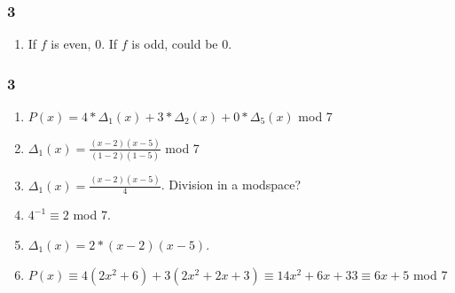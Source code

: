 \documentclass{beamer}
\begin{document}
\begin{frame}

    \frametitle{3}
    \begin{enumerate}[<+->]
        \item If $f$ is even, 0. If $f$ is odd, could be 0.
    \end{enumerate}
\end{frame}


\begin{frame}

    \frametitle{3}
    \begin{enumerate}[<+->]
        \item $P(x) = 4 * \Delta_1(x) + 3 * \Delta_2(x) + 0 * \Delta_5(x)$ mod 7
        \item $\Delta_1(x) = \frac{(x - 2)(x-5)}{(1 - 2)(1-5)}$ mod 7
        \item $\Delta_1(x) = \frac{(x - 2)(x-5)}{4}$. Division in a modspace?
        \item $4^{-1} \equiv 2$ mod 7.
        \item $\Delta_1(x) = 2 * (x - 2)(x-5)$.
        \item $P(x) \equiv 4(2x^2 + 6) + 3(2x^2 +2x+3) \equiv 14x^2 + 6x + 33 \equiv 6x + 5$ mod 7
    \end{enumerate}
\end{frame}
\end{document}
